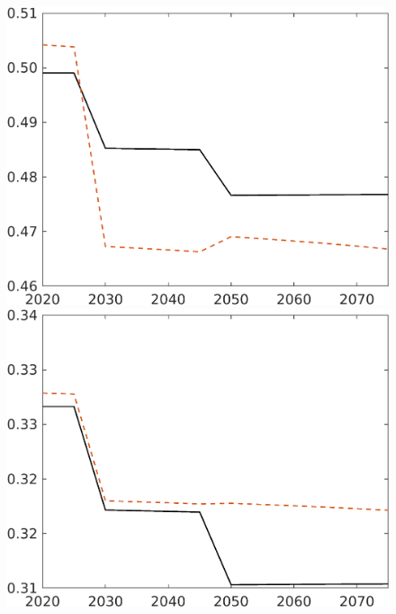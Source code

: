 \begin{figure}[h!!]
\begin{minipage}[]{0.32\textwidth}
	\includegraphics[width=1\textwidth]{../../codding_model/own_basedOnFried/optimalPol_190722_tidiedUp/figures/all_July22/hh_CompEffOPT_T_NoTaus_regime3_opteff_spillover0_noskill0_sep1_xgrowth0_countec0_etaa0.79_lgd0_lff0.png}
\end{minipage}
	\begin{minipage}[]{0.32\textwidth}
	\includegraphics[width=1\textwidth]{../../codding_model/own_basedOnFried/optimalPol_190722_tidiedUp/figures/all_July22/hl_CompEffOPT_T_NoTaus_regime3_opteff_spillover0_noskill0_sep1_xgrowth0_countec0_etaa0.79_lgd0_lff0.png}
\end{minipage}


\end{figure}
